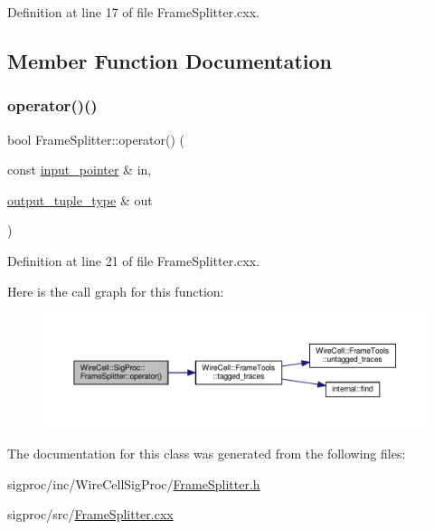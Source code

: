 Definition at line 17 of file Frame\+Splitter.\+cxx.



\subsection{Member Function Documentation}
\mbox{\label{class_wire_cell_1_1_sig_proc_1_1_frame_splitter_a1cd01d98b6da5cb6df5fe4941d1564f3}} 
\subsubsection{\texorpdfstring{operator()()}{operator()()}}
{\footnotesize\ttfamily bool Frame\+Splitter\+::operator() (\begin{DoxyParamCaption}\item[{const \hyperlink{class_wire_cell_1_1_i_split_node_a270990964b36cf939159efa595779407}{input\+\_\+pointer} \&}]{in,  }\item[{\hyperlink{class_wire_cell_1_1_i_split_node_acd382a6b5a9c3f322943ce2dd66fa7f4}{output\+\_\+tuple\+\_\+type} \&}]{out }\end{DoxyParamCaption})\hspace{0.3cm}{\ttfamily [virtual]}}



Definition at line 21 of file Frame\+Splitter.\+cxx.

Here is the call graph for this function\+:
\nopagebreak
\begin{figure}[H]
\begin{center}
\leavevmode
\includegraphics[width=350pt]{class_wire_cell_1_1_sig_proc_1_1_frame_splitter_a1cd01d98b6da5cb6df5fe4941d1564f3_cgraph}
\end{center}
\end{figure}


The documentation for this class was generated from the following files\+:\begin{DoxyCompactItemize}
\item 
sigproc/inc/\+Wire\+Cell\+Sig\+Proc/\hyperlink{_frame_splitter_8h}{Frame\+Splitter.\+h}\item 
sigproc/src/\hyperlink{_frame_splitter_8cxx}{Frame\+Splitter.\+cxx}\end{DoxyCompactItemize}
